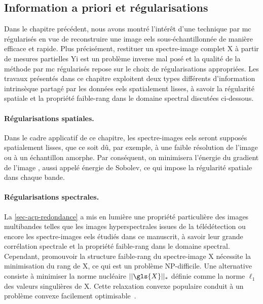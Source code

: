 \subsection{Information a priori et régularisations}\label{subsec-BR-reguls}

Dans le chapitre précédent, nous avons montré l'intérêt d'une technique par \gls{mc} régularisés en vue de reconstruire une image \gls{eels} sous-échantillonnée de manière efficace et rapide. Plus précisément, restituer un spectre-image complet \gls{X} à partir de mesures partielles \gls{Yi} est un problème inverse mal posé et la qualité de la méthode par \gls{mc} régularisés repose sur le choix de régularisations appropriées.
%
Les travaux présentés dans ce chapitre exploitent deux types différents d'information intrinsèque partagé par les données \gls{eels} spatialement lisses, à savoir la régularité spatiale et la propriété faible-rang dans le domaine spectral discutées ci-dessous.

\paragraph{Régularisations spatiales.} Dans le cadre applicatif de ce chapitre, les spectre-images \gls{eels} seront supposés spatialement lisses, que ce soit dû, par exemple, à une faible résolution de l'image ou à un échantillon amorphe. Par conséquent, on minimisera l'énergie du gradient de l'image , aussi appelé énergie de Sobolev, ce qui impose la régularité spatiale dans chaque bande.

\paragraph{Régularisations spectrales.} La \cref{sec-acp-redondance} a mis en lumière une propriété particulière des images multibandes telles que les images hyperspectrales issues de la télédétection ou encore les spectre-images \gls{eels} étudiés dans ce manuscrit, à savoir leur grande corrélation spectrale et la propriété faible-rang dans le domaine spectral. Cependant, promouvoir la structure faible-rang du spectre-image \gls{X} nécessite la minimisation du rang de \gls{X}, ce qui est un problème NP-difficile. Une alternative consiste à minimiser la norme nucléaire $||\gls{X}||_*$ définie comme la norme $\ell_1$ des valeurs singulières de \gls{X}. Cette relaxation convexe populaire conduit à un problème convexe facilement optimisable~\cite{recht2010guaranteed}.

